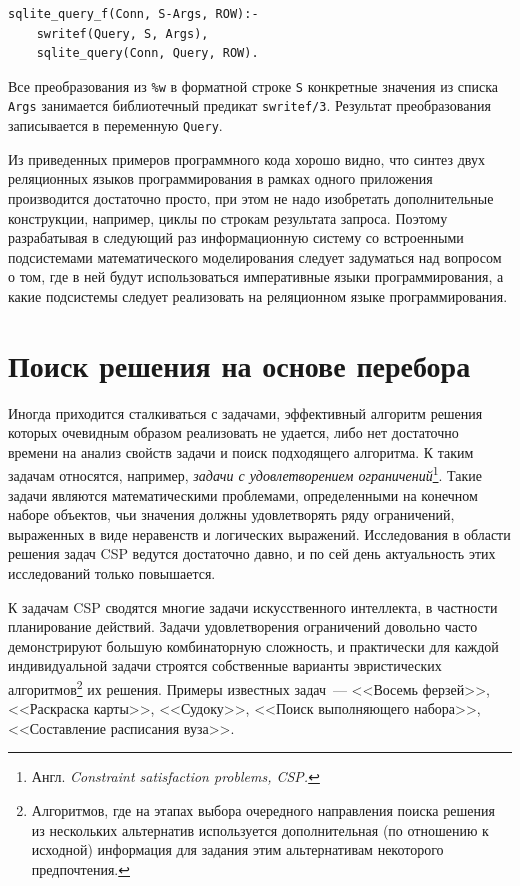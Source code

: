 \documentclass[a4paper,14pt, openany, twoside, draft]{extbook} %
\newcommand{\nnn}[2][ncolor]{\noindent%
\textcolor{eclr}{!\ [}\textcolor{#1}{#2}\textcolor{eclr}{]}}
\begin{document}
\begin{verbatim}
sqlite_query_f(Conn, S-Args, ROW):-
    swritef(Query, S, Args),
    sqlite_query(Conn, Query, ROW).
\end{verbatim}

Все преобразования из \texttt{\%w} в форматной строке \texttt{S} конкретные значения из списка \texttt{Args} занимается библиотечный предикат \texttt{swritef/3}.  Результат преобразования записывается в переменную \texttt{Query}.

Из приведенных примеров программного кода хорошо видно, что синтез двух реляционных языков программирования в рамках одного приложения производится достаточно просто, при этом не надо изобретать дополнительные конструкции, например, циклы по строкам результата запроса.  Поэтому разрабатывая в следующий раз информационную систему со встроенными подсистемами математического моделирования \cite{asya2008} следует задуматься над вопросом о том, где в ней будут использоваться императивные языки программирования, а какие подсистемы следует реализовать на реляционном языке программирования.



\chapter{Поиск решения на основе перебора} \label{sec:britmuseum}

Иногда приходится сталкиваться с задачами, эффективный алгоритм решения которых очевидным образом реализовать не удается, либо нет достаточно времени на анализ свойств задачи и поиск подходящего алгоритма. К таким задачам относятся, например, \emph{задачи с удовлетворением ограничений}\footnote{Англ. \emph{\foreignlanguage{english}{Constraint satisfaction problems}, CSP.}}. Такие задачи являются математическими проблемами, определенными на конечном наборе объектов, чьи значения должны удовлетворять ряду ограничений, выраженных в виде неравенств и логических выражений. Исследования в области решения задач CSP ведутся достаточно давно, и по сей день актуальность этих исследований только повышается.

К задачам CSP сводятся многие задачи искусственного интеллекта, в частности планирование действий. Задачи удовлетворения ограничений довольно часто демонстрируют большую комбинаторную сложность, и практически для каждой индивидуальной задачи строятся собственные варианты эвристических алгоритмов\footnote{Алгоритмов, где на этапах выбора очередного направления поиска решения из нескольких альтернатив используется дополнительная (по отношению к исходной) информация для задания этим альтернативам некоторого предпочтения.} их решения. Примеры известных задач~--- <<Восемь ферзей>>, <<Раскраска карты>>, <<Судоку>>, <<Поиск выполняющего набора>>, <<Составление расписания вуза>>.
\end{document}
